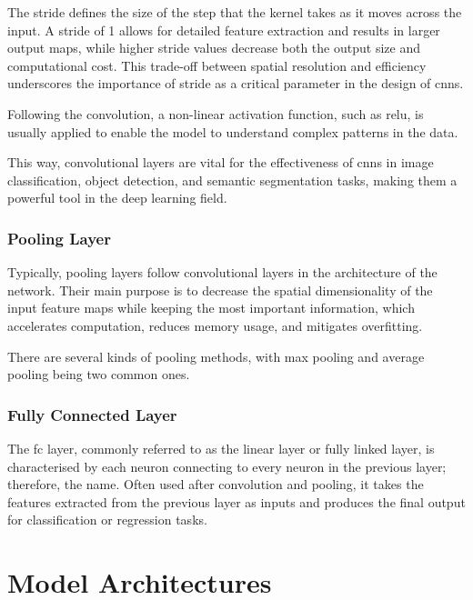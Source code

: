 The stride defines the size of the step that the kernel takes as it moves across the input. A stride of 1 allows for detailed feature extraction and results in larger output maps, while higher stride values decrease both the output size and computational cost. This trade-off between spatial resolution and efficiency underscores the importance of stride as a critical parameter in the design of \acp{cnn}.

Following the convolution, a non-linear activation function, such as \ac{relu}, is usually applied to enable the model to understand complex patterns in the data.

This way, convolutional layers are vital for the effectiveness of \acp{cnn} in image classification, object detection, and semantic segmentation tasks, making them a powerful tool in the deep learning field.


\subsubsection{Pooling Layer}

Typically, pooling layers follow convolutional layers in the architecture of the network.
Their main purpose is to decrease the spatial dimensionality of the input feature maps while keeping the most important information, which accelerates computation, reduces memory usage, and mitigates overfitting.

There are several kinds of pooling methods, with max pooling and average pooling being two common ones.

\subsubsection{Fully Connected Layer}
The \ac{fc} layer, commonly referred to as the linear layer or fully linked layer, is characterised by each neuron connecting to every neuron in the previous layer; therefore, the name.
Often used after convolution and pooling, it takes the features extracted from the previous layer as inputs and produces the final output for classification or regression tasks.


\section{Model Architectures}

